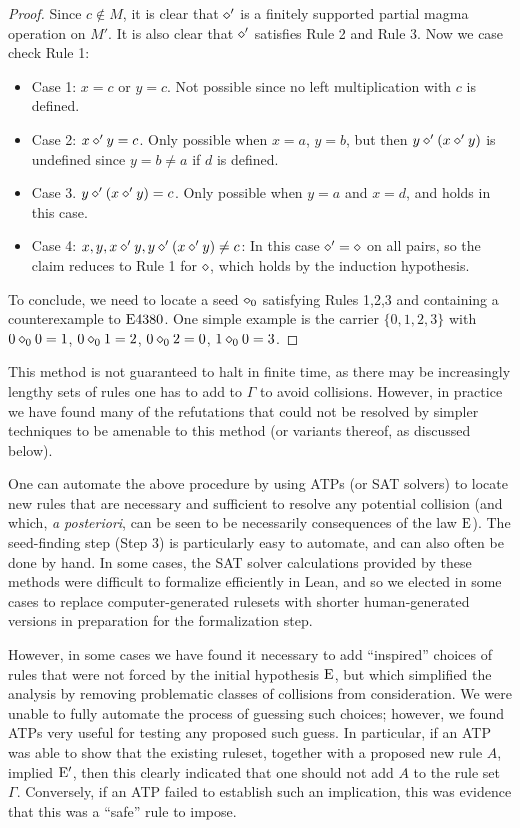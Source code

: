 \begin{proof}
Since $c \not \in M$, it is clear that $\diamond'$ is a finitely supported partial magma operation on $M'$.  It is also clear that $\diamond'$ satisfies Rule 2 and Rule 3.   Now we case check Rule 1:
\begin{itemize}
\item Case 1: $x=c$ or $y=c$.  Not possible since no left multiplication with $c$ is defined.
\item Case 2: $x \diamond' y = c$.  Only possible when $x = a$, $y = b$, but then $y \diamond' (x \diamond' y)$ is undefined since $y = b \neq a$ if $d$ is defined.
\item Case 3. $y \diamond' (x \diamond' y) = c$.  Only possible when $y=a$ and $x=d$, and holds in this case.
\item Case 4: $x, y, x \diamond' y, y \diamond' (x \diamond' y) \neq c$: In this case $\diamond'=\diamond$ on all pairs, so the claim reduces to Rule 1 for $\diamond$, which holds by the induction hypothesis.
\end{itemize}
To conclude, we need to locate a seed $\diamond_0$ satisfying Rules 1,2,3 and containing a counterexample to $\mathrm{E}4380$.  One simple example is the carrier $\{0,1,2,3\}$ with $0 \diamond_0 0 = 1$, $0 \diamond_0 1 = 2$, $0 \diamond_0 2 = 0$, $1 \diamond_0 0 = 3$.
\end{proof}

This method is not guaranteed to halt in finite time, as there may be increasingly lengthy sets of rules one has to add to $\Gamma$ to avoid collisions.  However, in practice we have found many of the refutations that could not be resolved by simpler techniques to be amenable to this method (or variants thereof, as discussed below).

One can automate the above procedure by using ATPs (or SAT solvers) to locate new rules that are necessary and sufficient to resolve any potential collision (and which, \emph{a posteriori}, can be seen to be necessarily consequences of the law $\mathrm{E}$).  The seed-finding step (Step 3) is particularly easy to automate, and can also often be done by hand.  In some cases, the SAT solver calculations provided by these methods were difficult to formalize efficiently in Lean, and so we elected in some cases to replace computer-generated rulesets with shorter human-generated versions in preparation for the formalization step.

However, in some cases we have found it necessary to add ``inspired'' choices of rules that were not forced by the initial hypothesis $\mathrm{E}$, but which simplified the analysis by removing problematic classes of collisions from consideration.  We were unable to fully automate the process of guessing such choices; however, we found ATPs very useful for testing any proposed such guess.  In particular, if an ATP was able to show that the existing ruleset, together with a proposed new rule $A$, implied ${\mathrm{E}'}$, then this clearly indicated that one should not add $A$ to the rule set $\Gamma$.  Conversely, if an ATP failed to establish such an implication, this was evidence that this was a ``safe'' rule to impose.

